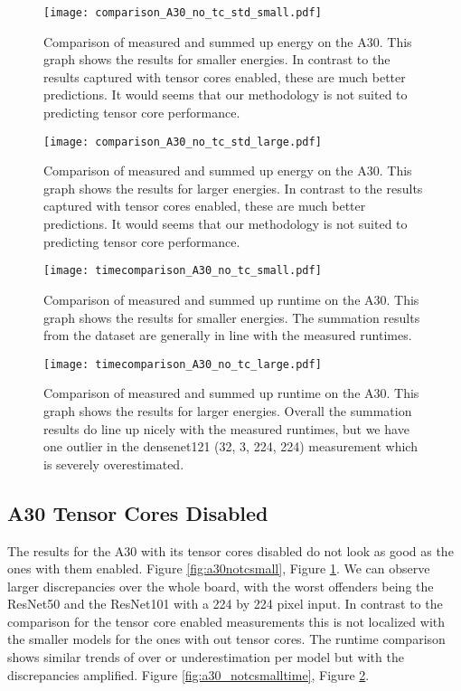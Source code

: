 \documentclass[conference]{IEEEtran}
\begin{document}
\begin{figure}
    \texttt{[image: comparison\_A30\_no\_tc\_std\_small.pdf]}
    \caption{Comparison of measured and summed up energy on the A30. This graph shows the results for smaller energies. In contrast to the results captured with tensor cores enabled, these are much better predictions. It would seems that our methodology is not suited to predicting tensor core performance.}
    \label{fig:a30notcsmall}
    \texttt{[image: comparison\_A30\_no\_tc\_std\_large.pdf]}
    \caption{Comparison of measured and summed up energy on the A30. This graph shows the results for larger energies. In contrast to the results captured with tensor cores enabled, these are much better predictions. It would seems that our methodology is not suited to predicting tensor core performance.}
    \label{fig:a30notclarge}
\end{figure}


\begin{figure}
    \texttt{[image: timecomparison\_A30\_no\_tc\_small.pdf]}
    \caption{Comparison of measured and summed up runtime on the A30. This graph shows the results for smaller energies. The summation results from the dataset are generally in line with the measured runtimes.}
    \label{fig:a30_notcsmalltime}
    \texttt{[image: timecomparison\_A30\_no\_tc\_large.pdf]}
    \caption{Comparison of measured and summed up runtime on the A30. This graph shows the results for larger energies. Overall the summation results do line up nicely with the measured runtimes, but we have one outlier in the densenet121 (32, 3, 224, 224) measurement which is severely overestimated.}
    \label{fig:a30notclargetime}
\end{figure}

\subsection{A30 Tensor Cores Disabled}
The results for the A30 with its tensor cores disabled do not look as good as the ones with them enabled. Figure \ref{fig:a30notcsmall}, Figure \ref{fig:a30notclarge}. We can observe larger discrepancies over the whole board, with the worst offenders being the ResNet50 and the ResNet101 with a 224 by 224 pixel input. In contrast to the comparison for the tensor core enabled measurements this is not localized with the smaller models for the ones with out tensor cores. The runtime comparison shows similar trends of over or underestimation per model but with the discrepancies amplified. Figure 
\ref{fig:a30_notcsmalltime}, Figure \ref{fig:a30notclargetime}.
\end{document}
